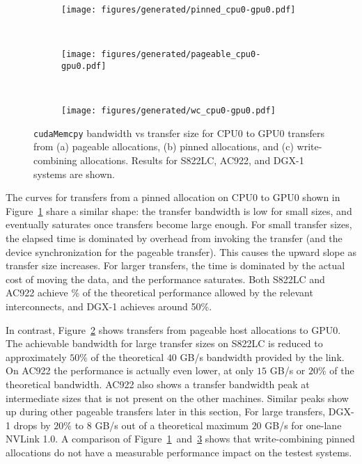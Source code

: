 \begin{figure}[H]
	\centering
	\begin{subfigure}[b]{0.3\textwidth}
		\texttt{[image: figures/generated/pinned\_cpu0-gpu0.pdf]}
		\caption{}
		\label{fig:pinned-cpu0-gpu0}
	\end{subfigure}
	~
	\begin{subfigure}[b]{0.3\textwidth}
		\texttt{[image: figures/generated/pageable\_cpu0-gpu0.pdf]}
		\caption{}
		\label{fig:pageable-cpu0-gpu0}
	\end{subfigure}
	~
	\begin{subfigure}[b]{0.3\textwidth}
		\texttt{[image: figures/generated/wc\_cpu0-gpu0.pdf]}
		\caption{}
		\label{fig:wc-cpu0-gpu0}
	\end{subfigure}
	\caption[\texttt{cudaMemcpy} bandwidth for CPU0-GPU0 transfers.]{
		\texttt{cudaMemcpy} bandwidth vs transfer size for CPU0 to GPU0 transfers from 
		(a) pageable allocations,
		(b) pinned allocations, and
		(c) write-combining allocations.
		Results for S822LC, AC922, and DGX-1 systems are shown.
	}
	\label{fig:pageable-pinned-wc}
\end{figure}


The curves for transfers from a pinned allocation on CPU0 to GPU0 shown in Figure~\ref{fig:pinned-cpu0-gpu0} share a similar shape: the transfer bandwidth is low for small sizes, and eventually saturates once transfers become large enough.
For small transfer sizes, the elapsed time is dominated by overhead from invoking the transfer (and the device synchronization for the pageable transfer).
This causes the upward slope as transfer size increases.
For larger transfers, the time is dominated by the actual cost of moving the data, and the performance saturates.
Both S822LC and AC922 achieve \% of the theoretical performance allowed by the relevant interconnects, and DGX-1 achieves around 50\%.

In contrast, Figure~\ref{fig:pageable-cpu0-gpu0} shows transfers from pageable host allocations to GPU0.
The achievable bandwidth for large transfer sizes on S822LC is reduced to approximately $50\%$ of the theoretical $40$ GB/s bandwidth provided by the link.
On AC922 the performance is actually even lower, at only $15$ GB/s or $20\%$ of the theoretical bandwidth.
AC922 also shows a transfer bandwidth peak at intermediate sizes that is not present on the other machines.
Similar peaks show up during other pageable transfers later in this section, 
For large transfers, DGX-1 drops by $20\%$ to $8$ GB/s out of a theoretical maximum $20$ GB/s for one-lane NVLink 1.0.
A comparison of Figure~\ref{fig:pinned-cpu0-gpu0}~and~\ref{fig:wc-cpu0-gpu0} shows that write-combining pinned allocations do not have a measurable performance impact on the testest systems.

